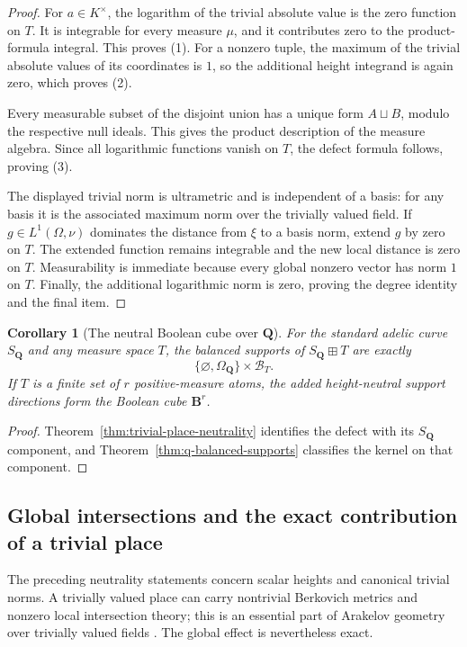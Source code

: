 \documentclass[11pt]{amsart}
\numberwithin{equation}{section}
\newtheorem{corollary}[theorem]{Corollary}
\theoremstyle{definition}
\newcommand{\B}{\mathbf B}
\newcommand{\Q}{\mathbf Q}
\begin{document}
\begin{proof}
For $a\in K^\times$, the logarithm of the trivial absolute value is the
zero function on $T$.  It is integrable for every measure $\mu$, and it
contributes zero to the product-formula integral.  This proves (1).
For a nonzero tuple, the maximum of the trivial absolute values of its
coordinates is $1$, so the additional height integrand is again zero,
which proves (2).

Every measurable subset of the disjoint union has a unique form
$A\sqcup B$, modulo the respective null ideals.  This gives the product
description of the measure algebra.  Since all logarithmic functions
vanish on $T$, the defect formula follows, proving (3).

The displayed trivial norm is ultrametric and is independent of a basis:
for any basis it is the associated maximum norm over the trivially valued
field.  If $g\in L^1(\Omega,\nu)$ dominates the distance from $\xi$ to a
basis norm, extend $g$ by zero on $T$.  The extended function remains
integrable and the new local distance is zero on $T$.  Measurability is
immediate because every global nonzero vector has norm $1$ on $T$.
Finally, the additional logarithmic norm is zero, proving the degree
identity and the final item.
\end{proof}

\begin{corollary}[The neutral Boolean cube over $\Q$]
\label{cor:q-neutral-support-cube}
For the standard adelic curve $S_\Q$ and any measure space $T$, the balanced
supports of $S_\Q\boxplus T$ are exactly
\[
\bigl\{\varnothing,\Omega_\Q\bigr\}\times\mathscr B_T.
\]
If $T$ is a finite set of $r$ positive-measure atoms, the added
height-neutral support directions form the Boolean cube $\B^r$.
\end{corollary}

\begin{proof}
Theorem~\ref{thm:trivial-place-neutrality} identifies the defect with its
$S_\Q$ component, and Theorem~\ref{thm:q-balanced-supports} classifies the
kernel on that component.
\end{proof}

\subsection{Global intersections and the exact contribution of a trivial place}

The preceding neutrality statements concern scalar heights and canonical
trivial norms.  A trivially valued place can carry nontrivial Berkovich
metrics and nonzero local intersection theory; this is an essential part of
Arakelov geometry over trivially valued fields
\cite{ChenMoriwakiDirichlet}.  The global effect is nevertheless exact.
\end{document}
